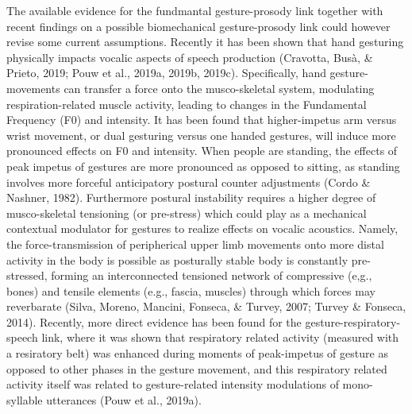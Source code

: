 \documentclass[
  man,floatsintext]{apa6}
\begin{document}
The available evidence for the fundmantal gesture-prosody link together with recent findings on a possible biomechanical gesture-prosody link could however revise some current assumptions. Recently it has been shown that hand gesturing physically impacts vocalic aspects of speech production (Cravotta, Busà, \& Prieto, 2019; Pouw et al., 2019a, 2019b, 2019c). Specifically, hand gesture-movements can transfer a force onto the musco-skeletal system, modulating respiration-related muscle activity, leading to changes in the Fundamental Frequency (F0) and intensity. It has been found that higher-impetus arm versus wrist movement, or dual gesturing versus one handed gestures, will induce more pronounced effects on F0 and intensity. When people are standing, the effects of peak impetus of gestures are more pronounced as opposed to sitting, as standing involves more forceful anticipatory postural counter adjustments (Cordo \& Nashner, 1982). Furthermore postural instability requires a higher degree of musco-skeletal tensioning (or pre-stress) which could play as a mechanical contextual modulator for gestures to realize effects on vocalic acoustics. Namely, the force-transmission of peripherical upper limb movements onto more distal activity in the body is possible as posturally stable body is constantly pre-stressed, forming an interconnected tensioned network of compressive (e,g., bones) and tensile elements (e.g., fascia, muscles) through which forces may reverbarate (Silva, Moreno, Mancini, Fonseca, \& Turvey, 2007; Turvey \& Fonseca, 2014). Recently, more direct evidence has been found for the gesture-respiratory-speech link, where it was shown that respiratory related activity (measured with a resiratory belt) was enhanced during moments of peak-impetus of gesture as opposed to other phases in the gesture movement, and this respiratory related activity itself was related to gesture-related intensity modulations of mono-syllable utterances (Pouw et al., 2019a).\\
\end{document}
